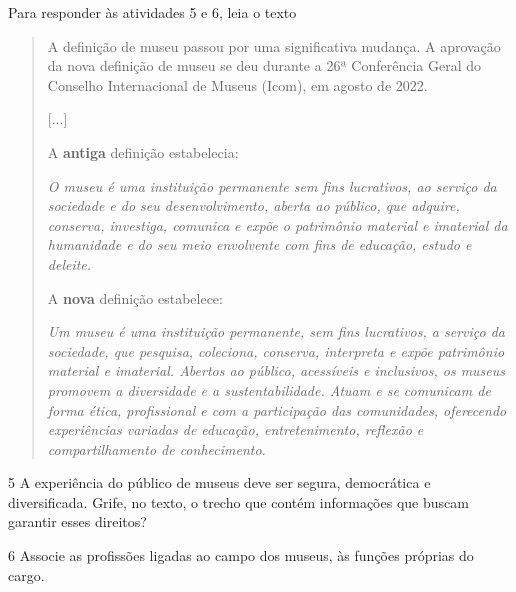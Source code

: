 
\noindent{}Para responder às atividades 5 e 6, leia o texto

\begin{quote}
A definição de museu passou por uma significativa mudança. A aprovação
da nova definição de museu se deu durante a 26ª Conferência Geral do
Conselho Internacional de Museus (Icom), em agosto de 2022.

{[}...{]}

A \textbf{antiga} definição estabelecia:

\emph{O museu é uma instituição permanente sem fins lucrativos, ao
serviço da sociedade e do seu desenvolvimento, aberta ao público, que
adquire, conserva, investiga, comunica e expõe o patrimônio material e
imaterial da humanidade e do seu meio envolvente com fins de educação,
estudo e deleite.}

A \textbf{nova} definição estabelece:

\emph{Um museu é uma instituição permanente, sem fins lucrativos, a
serviço da sociedade, que pesquisa, coleciona, conserva, interpreta e
expõe patrimônio material e imaterial. Abertos ao público, acessíveis e
inclusivos, os museus promovem a diversidade e a sustentabilidade. Atuam
e se comunicam de forma ética, profissional e com a participação das
comunidades, oferecendo experiências variadas de educação,
entretenimento, reflexão e compartilhamento de conhecimento.}

\end{quote}

\num{5}  A experiência do público de museus deve ser segura, democrática e
  diversificada. Grife, no texto, o trecho que contém informações que
  buscam garantir esses direitos?


\num{6}  Associe as profissões ligadas ao campo dos museus, às funções próprias do cargo.

